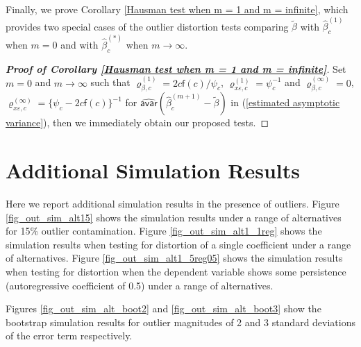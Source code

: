 \documentclass[11pt, letterpaper]{article}
\numberwithin{algorithm}{section}
\numberwithin{assumption}{section}
\numberwithin{lemma}{section}
\numberwithin{theorem}{section}
\numberwithin{corollary}{section}
\numberwithin{remark}{section}
\numberwithin{equation}{section}
\numberwithin{figure}{section}
\numberwithin{table}{section}
\begin{document}
Finally, we prove Corollary \ref{Hausman test when m = 1 and m = infinite}, which provides two special cases of the outlier distortion tests comparing $\widetilde{\beta}$ with $\widehat{\beta}_{c}^{(1)}$ when $m = 0$ and with $\widehat{\beta}_{c}^{(\ast)}$ when $m \to \infty$.

\begin{proof}[\textnormal{\textbf{Proof of Corollary \ref{Hausman test when m = 1 and m = infinite}}}]
Set $m = 0$ and $m \to \infty$ such that $\varrho_{\beta, c}^{(1)} = 2 c \mathsf{f}(c) / \psi_{c}$, $\varrho_{x \varepsilon, c}^{(1)} = \psi_{c}^{-1}$ and $\varrho_{\beta, c}^{(\infty)} = 0$, $\varrho_{x \varepsilon, c}^{(\infty)} = \{ \psi_{c} - 2 c \mathsf{f}(c) \}^{-1}$ for $\widehat{\mathsf{avar}}(\widehat{\beta}_{c}^{(m + 1)} - \widetilde{\beta})$ in (\ref{estimated asymptotic variance}), then we immediately obtain our proposed tests.
\end{proof}

\clearpage
\section{Additional Simulation Results} \label{sec_add_sim}

Here we report additional simulation results in the presence of outliers. Figure \ref{fig_out_sim_alt15} shows the simulation results under a range of alternatives for 15\% outlier contamination. Figure \ref{fig_out_sim_alt1_1reg} shows the simulation results when testing for distortion of a single coefficient under a range of alternatives. Figure \ref{fig_out_sim_alt1_5reg05} shows the simulation results when testing for distortion when the dependent variable shows some persistence (autoregressive coefficient of 0.5) under a range of alternatives.

Figures \ref{fig_out_sim_alt_boot2} and \ref{fig_out_sim_alt_boot3} show the bootstrap simulation results for outlier magnitudes of 2 and 3 standard deviations of the error term respectively.
\end{document}
